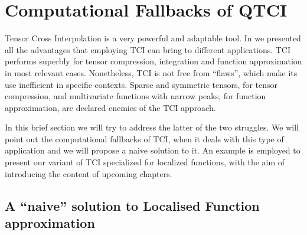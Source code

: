 \section{Computational Fallbacks of QTCI}
\label{sec:TCIFallbacks}
Tensor Cross Interpolation is a very powerful and adaptable tool. In  we presented all the advantages that employing TCI can bring to different applications. TCI performs superbly for tensor compression, integration and function approximation in most relevant cases. Nonetheless, TCI is not free from ``flaws'', which make its use inefficient in specific contexts. Sparse and symmetric tensors, for tensor compression, and multivariate functions with narrow peaks, for function approximation, are declared enemies of the TCI approach. 

In this brief section we will try to address the latter of the two struggles. We will point out the computational fallbacks of TCI, when it deals with this type of application and we will propose a naive solution to it. An example is employed to present our variant of TCI specialized for localized functions, with the aim of introducing the content of upcoming chapters.


\subsection{A ``naive'' solution to Localised Function approximation }



